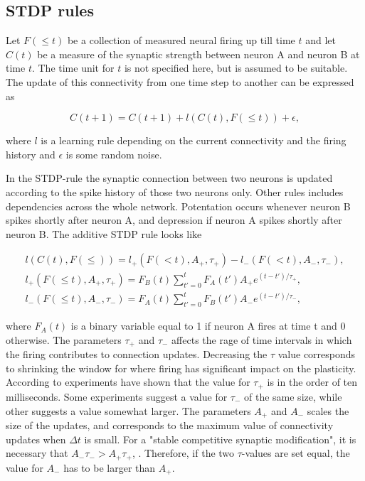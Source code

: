 \subsection{STDP rules}
\label{sec:LR}

Let $F(\leq t)$ be a collection of measured neural firing up till time $t$ and let $C(t)$ be a measure of the synaptic strength between neuron A and neuron B at time $t$. The time unit for $t$ is not specified here, but is assumed to be suitable. The update of this connectivity from one time step to another can be expressed as

\begin{equation}
\label{eq:LR}
    C(t+1) = C(t+1) + l(C(t), F(\leq t)) + \epsilon,
\end{equation}

where $l$ is a learning rule depending on the current connectivity and the firing history and $\epsilon$ is some random noise. 

In the STDP-rule the synaptic connection between two neurons is updated according to the spike history of those two neurons only. Other rules includes dependencies across the whole network. Potentation occurs whenever neuron B spikes shortly after neuron A, and depression if neuron A spikes shortly after neuron B. The additive STDP rule looks like

\begin{equation}
\label{eq:STDP}
    \begin{split}
    l(C(t), F(\leq)) = l_+(F(<t), A_+,\tau_+) - l_-(F(<t), A_-,\tau_-),\\ 
    l_+(F(\leq t), A_+,\tau_+) = F_B(t) \sum_{t'=0}^{t} F_A(t') A_+ e^{(t-t')/\tau_+},\\ 
    l_-(F(\leq t), A_-,\tau_-) = F_A(t) \sum_{t'=0}^{t} F_B(t') A_- e^{(t-t')/\tau_-},
    \end{split}
\end{equation}

where $F_A(t)$ is a binary variable equal to 1 if neuron A fires at time t and 0 otherwise. The parameters $\tau_+$ and $\tau_-$ affects the rage of time intervals in which the firing contributes to connection updates. Decreasing the $\tau$ value corresponds to shrinking the window for where firing has significant impact on the plasticity. According to \cite{Song} experiments have shown that the value for $\tau_+$ is in the order of ten milliseconds. Some experiments suggest a value for $\tau_-$ of the same size, while other suggests a value somewhat larger. The parameters $A_+$ and $A_-$ scales the size of the updates, and corresponds to the maximum value of connectivity updates when $\Delta t$ is small. For a "stable competitive synaptic modification", it is necessary that $A_-\tau_- > A_+\tau_+$, \cite{Song}. Therefore, if the two $\tau$-values are set equal, the value for $A_-$ has to be larger than $A_+$.

